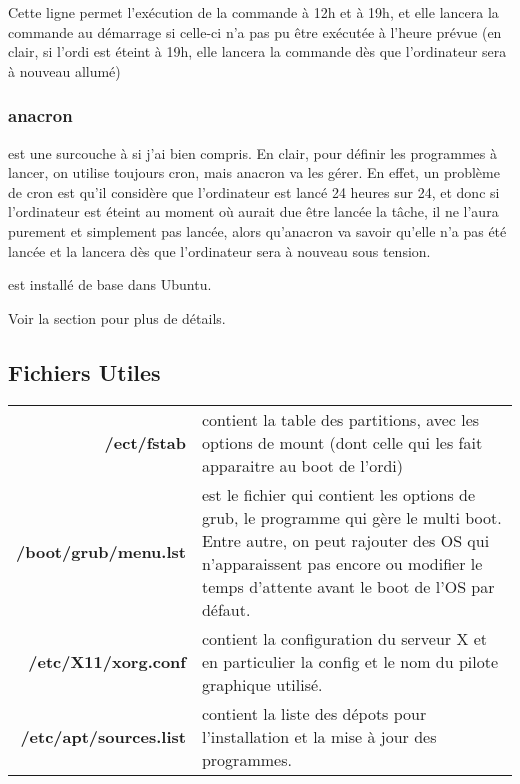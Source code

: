 \documentclass[a4paper,twoside]{article}
\begin{document}
Cette ligne permet l'exécution de la commande à 12h et à 19h, et elle lancera la commande au démarrage si celle-ci n'a pas pu être exécutée à l'heure prévue (en clair, si l'ordi est éteint à 19h, elle lancera la commande dès que l'ordinateur sera à nouveau allumé)


\subsubsection{anacron}
 est une surcouche à  si j'ai bien compris. En clair, pour définir les programmes à lancer, on utilise toujours cron, mais anacron va les gérer. En effet, un problème de cron est qu'il considère que l'ordinateur est lancé 24 heures sur 24, et donc si l'ordinateur est éteint au moment où aurait due être lancée la tâche, il ne l'aura purement et simplement pas lancée, alors qu'anacron va savoir qu'elle n'a pas été lancée et la lancera dès que l'ordinateur sera à nouveau sous tension.

\begin{remarque}
 est installé de base dans Ubuntu.
\end{remarque}

Voir la section  pour plus de détails.

\subsection{Fichiers Utiles}

\begin{tabular}{>{\bfseries}r<{}@{ : }p{9cm}}
/ect/fstab & contient la table des partitions, avec les options de mount (dont celle qui les fait apparaitre au boot de l'ordi) \\
/boot/grub/menu.lst & est le fichier qui contient les options de grub, le programme qui gère le multi boot. Entre autre, on peut rajouter des OS qui n'apparaissent pas encore ou modifier le temps d'attente avant le boot de l'OS par défaut.\\
/etc/X11/xorg.conf & contient la configuration du serveur X et en particulier la config et le nom du pilote graphique utilisé.\\
/etc/apt/sources.list & contient la liste des dépots pour l'installation et la mise à jour des programmes.\\
\end{tabular}
\end{document}
